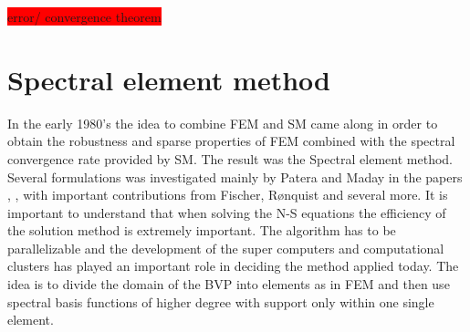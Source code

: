 \colorbox{red}{error/ convergence theorem}


\section{Spectral element method} \label{sem}
In the early 1980's the idea to combine FEM and SM came along in order to obtain the 
robustness and sparse properties of FEM 
combined with the spectral convergence rate provided by SM. 
The result was the Spectral element method. Several formulations was investigated mainly by 
Patera and Maday in the papers \cite{maday1989}, \cite{Patera1984}, \cite{Patera1986} with 
important contributions from Fischer, Rønquist and several more.
It is important to understand that when solving the N-S equations the efficiency of the solution 
method is extremely important. The algorithm has to be parallelizable and the development of the
super computers and computational clusters has played an important role in 
deciding the method applied today. 
The idea is to divide the domain of the BVP into elements as in FEM and then use spectral basis 
functions of higher degree with support only within one single element. 

